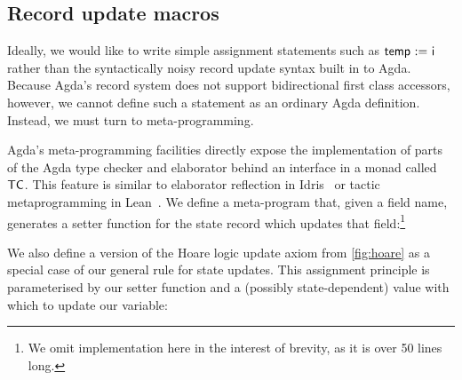 \documentclass[sigplan]{acmart}%
\begin{document}
\subsection{Record update macros}

Ideally, we would like to write simple assignment statements 
such as $\AgdaField{temp}\ \AgdaMacro{\ensuremath{:=}}\ \AgdaField{i}$ rather than 
the syntactically noisy record update syntax built in to Agda. Because Agda's 
record system does not support bidirectional first class accessors, however, 
we cannot define such a statement as an ordinary Agda definition. Instead, 
we must turn to meta-programming.

Agda's meta-programming facilities directly expose the implementation of
parts of the Agda type checker and elaborator behind an interface in a 
monad called $\AgdaDatatype{TC}$. This feature is similar to 
elaborator reflection in Idris~\citep{elab1} or tactic metaprogramming in Lean~\citep{leantac}.
We define a meta-program that, given a field name, generates a setter function 
for the state record which updates that field:\footnote{We omit implementation here 
in the interest of brevity, as it is over 50 lines long.}
\begin{code}
  \>[3]\AgdaSpace{}%
  \AgdaSymbol{:}\AgdaSpace{}%
  \AgdaSymbol{\{}\AgdaSpace{}%
  \AgdaSymbol{:}\AgdaSpace{}%
  \AgdaSymbol{\}}\AgdaSpace{}%
  \AgdaSpace{}%
  \AgdaSpace{}%
  \AgdaSpace{}%
  \AgdaSpace{}%
  \AgdaSymbol{(}\AgdaSpace{}%
  \AgdaSpace{}%
  \AgdaSpace{}%
  \AgdaSpace{}%
  \AgdaSymbol{)}\<%
\end{code}
We also define a version of the Hoare logic update
axiom from \autoref{fig:hoare} as a special case of our 
general rule for state updates. This assignment principle is 
parameterised by our setter function and a (possibly state-dependent)
value with which to update our variable:
\end{document}
